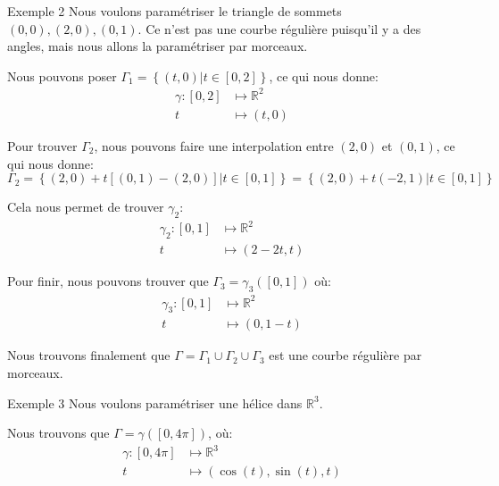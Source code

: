 \documentclass[a4paper]{article}
\begin{document}
\begin{parag}{Exemple 2}
    Nous voulons paramétriser le triangle de sommets $\left(0, 0\right), \left(2, 0\right), \left(0, 1\right)$. Ce n'est pas une courbe régulière puisqu'il y a des angles, mais nous allons la paramétriser par morceaux.

    Nous pouvons poser $\Gamma_1 = \left\{\left(t, 0\right) | t\in\left[0, 2\right]\right\}$, ce qui nous donne:
    \[\begin{split}
    \gamma: \left[0, 2\right] &\longmapsto \mathbb{R}^2 \\
    t &\longmapsto \left(t, 0\right)
    \end{split}\]
    
    Pour trouver $\Gamma_2$, nous pouvons faire une interpolation entre $\left(2, 0\right)$ et $\left(0, 1\right)$, ce qui nous donne: 
    \[\Gamma_2 = \left\{\left(2, 0\right) + t\left[\left(0, 1\right) - \left(2, 0\right)\right] |t \in \left[0, 1\right]\right\} = \left\{\left(2, 0\right) + t\left(-2, 1\right) | t \in \left[0, 1\right]\right\} \]
    
    Cela nous permet de trouver $\gamma_2$: 
    \[\begin{split}
    \gamma_2: \left[0, 1\right] &\longmapsto \mathbb{R}^2 \\
    t &\longmapsto \left(2 - 2t, t\right)
    \end{split}\]
    
    Pour finir, nous pouvons trouver que $\Gamma_3 = \gamma_3\left(\left[0, 1\right]\right)$ où:
    \[\begin{split}
    \gamma_3: \left[0, 1\right] &\longmapsto \mathbb{R}^2 \\
    t &\longmapsto \left(0, 1 - t\right)
    \end{split}\]
    
    Nous trouvons finalement que $\Gamma = \Gamma_1 \cup \Gamma_2 \cup \Gamma_3$ est une courbe régulière par morceaux.
\end{parag}

\begin{parag}{Exemple 3}
    Nous voulons paramétriser une hélice dans $\mathbb{R}^3$.

    Nous trouvons que $\Gamma = \gamma\left(\left[0, 4\pi\right]\right)$, où:
    \[\begin{split}
    \gamma : \left[0, 4\pi\right] &\longmapsto \mathbb{R}^3 \\
    t &\longmapsto \left(\cos\left(t\right), \sin\left(t\right), t\right)
    \end{split}\]
\end{parag}
\end{document}
